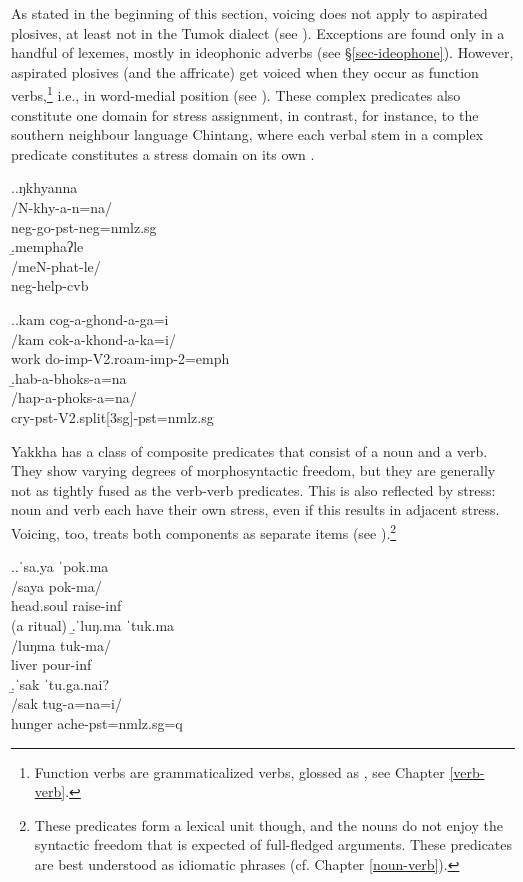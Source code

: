 As stated in the beginning of this section, voicing does not apply to aspirated plosives, at least not in the Tumok dialect (see \Next). Exceptions are found only in a handful of lexemes, mostly in ideophonic adverbs (see §\ref{sec-ideophone}). However, aspirated plosives (and the affricate) get voiced when they occur as function verbs,\footnote{Function verbs are grammaticalized verbs, glossed as , see Chapter \ref{verb-verb}. } i.e., in word-medial position (see \NNext). These complex predicates also constitute one domain for stress assignment, in contrast, for instance, to the southern neighbour language Chintang, where each verbal stem in a complex predicate constitutes a stress domain on its own \citep[57]{Bickeletal2007Free}. 

\ex.\a.\glll ŋkhyanna\\
/N-khy-a-n=na/\\
{\sc neg-}go{\sc [3sg]-pst-neg=nmlz.sg}\\
\b.\glll memphaʔle\\
/meN-phat-le/\\
{\sc neg-}help{\sc -cvb}\\


\ex.\a.\glll kam cog-a-ghond-a-ga=i\\
/kam cok-a-khond-a-ka=i/\\
work do{\sc -imp-V2.roam-imp-2=emph}\\
\b.\glll hab-a-bhoks-a=na\\
/hap-a-phoks-a=na/\\
cry{\sc -pst-V2.split[3sg]-pst=nmlz.sg}\\

 

Yakkha has a class of composite predicates that consist of a noun and a verb. They show varying degrees of morphosyntactic freedom, but they are generally not as tightly fused as the  verb-verb predicates. This is also reflected by stress: noun and verb each have their own stress, even if this results in adjacent stress. Voicing, too, treats both components as separate items  (see \Next).\footnote{These predicates form a lexical unit though, and the nouns do not enjoy the syntactic freedom that is expected of full-fledged arguments. These predicates are best understood as idiomatic phrases (cf. Chapter \ref{noun-verb}).}

\ex.\a.\glll ˈsa.ya  ˈpok.ma\\
/saya pok-ma/\\
head.soul raise{\sc -inf}\\
 (a ritual)
\b.\glll  ˈluŋ.ma ˈtuk.ma\\
/luŋma tuk-ma/\\
liver pour{\sc -inf}\\
\b.\glll  ˈsak ˈtu.ga.nai?\\
/sak tug-a=na=i/\\
hunger ache{\sc [3sg]-pst=nmlz.sg=q}\\


